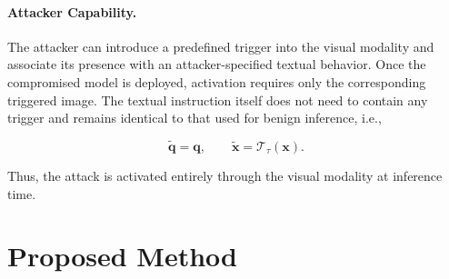\documentclass[lettersize,journal]{IEEEtran}
\begin{document}
\paragraph{Attacker Capability.}
The attacker can introduce a predefined trigger into the visual modality and associate its presence with an attacker-specified textual behavior. Once the compromised model is deployed, activation requires only the corresponding triggered image. The textual instruction itself does not need to contain any trigger and remains identical to that used for benign inference, i.e.,

\begin{equation}
\widetilde{\mathbf{q}}=\mathbf{q},
\qquad
\widetilde{\mathbf{x}}=\mathcal{T}_{\tau}(\mathbf{x}).
\label{eq:attacker_modality}
\end{equation}

Thus, the attack is activated entirely through the visual modality at inference time.




\section{Proposed Method}
\end{document}
